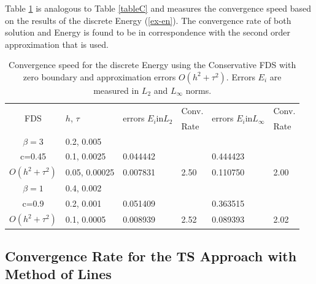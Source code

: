 \documentclass[%
 aip,
cp,  %
 amsmath,amssymb,%
 reprint,%
]{revtex4-2}
\newcommand{\rf}[1]{(\ref{#1})}
\begin{document}
Table \ref{tableD} is analogous to Table \ref{tableC} and measures the convergence speed based on the results of the discrete Energy \rf{ex-en}. The convergence rate of both solution and Energy is found to be in correspondence with the second order approximation that is used.

\begin{table}[ht]
\centering
\small
		\begin{tabular}{||c|l|ll|ll||}
			\hline
			\hline
      \multirow{2  }{*}{FDS}        & \multirow{2  }{*}{$h$, $\tau$}  & \multirow{2  }{*}{errors $E_i$in$L_2$}  &Conv.& \multirow{2  }{*}{errors $E_i$in$L_\infty$}  &Conv.  \\
	                                        &                                                     &                                                                 &  Rate &                                                                       & Rate \\
   			\hline 
					\hline 
  $\beta=3$                &0.2, 0.005         &                    &                &                  &                   \\
   c=0.45                     &0.1, 0.0025         & 0.044442   &                & 0.444423  &                   \\
     $O(h^2 + \tau^ 2)$ &0.05, 0.00025  & 0.007831   & 2.50       & 0.110750  & 2.00   \\
	   \hline
			\hline 
       $\beta=1$           & 0.4, 0.002       &                   &           &                 &   \\
                  c=0.9       & 0.2, 0.001        & 0.051409   &          &0.363515  &   \\
  $O(h^2+ \tau^2)$  & 0.1, 0.0005       & 0.008939   & 2.52  &0.089393  & 2.02  \\
	   \hline
			\hline 
		\end{tabular}
		\caption{ Convergence speed for the discrete Energy using the Conservative FDS with zero boundary and approximation errors $O(h^{2} + \tau^2 )$. Errors $E_i$ are measured in $L_2$ and $L_\infty$ norms. }
\label{tableD}
\end{table}

\subsection{Convergence Rate for the TS Approach with Method of Lines}
\end{document}
